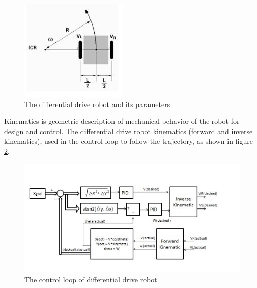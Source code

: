\begin{figure}[H]%
    \center%
    \includegraphics[width=.5\textwidth]{images/Alzahraa/differential_drive.JPG}%
    \caption[Differential Drive Robot]{The differential drive robot and its parameters}\label{fig: diff drive}%
  \end{figure}
  
Kinematics is geometric description of mechanical behavior of the robot for design and control.\cite{web001} 
The differential drive robot kinematics (forward and inverse kinematics), used in the control loop to follow the trajectory, as shown in figure \ref{fig: control loop}.

\begin{figure}[H]%
    \center%
    \includegraphics[width=.8\textwidth]{images/Alzahraa/control_loop.JPG}%
    \caption[Control Loop]{The control loop of differential drive robot}\label{fig: control loop}%
  \end{figure}
 
